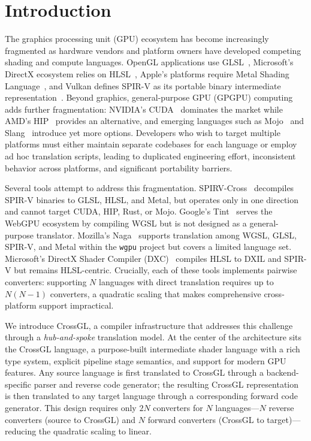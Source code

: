 \documentclass{svproc}
\begin{document}
\section{Introduction}

The graphics processing unit (GPU) ecosystem has become increasingly fragmented as hardware vendors and platform owners have developed competing shading and compute languages. OpenGL applications use GLSL~\cite{kessenich2016opengl}, Microsoft's DirectX ecosystem relies on HLSL~\cite{microsoft2023hlsl}, Apple's platforms require Metal Shading Language~\cite{apple2023metal}, and Vulkan defines SPIR-V as its portable binary intermediate representation~\cite{khronos2022spirv}. Beyond graphics, general-purpose GPU (GPGPU) computing adds further fragmentation: NVIDIA's CUDA~\cite{nickolls2008cuda} dominates the market while AMD's HIP~\cite{amd2023hip} provides an alternative, and emerging languages such as Mojo~\cite{modular2023mojo} and Slang~\cite{he2018slang} introduce yet more options. Developers who wish to target multiple platforms must either maintain separate codebases for each language or employ ad hoc translation scripts, leading to duplicated engineering effort, inconsistent behavior across platforms, and significant portability barriers.

Several tools attempt to address this fragmentation. SPIRV-Cross~\cite{khronos2023spirvcross} decompiles SPIR-V binaries to GLSL, HLSL, and Metal, but operates only in one direction and cannot target CUDA, HIP, Rust, or Mojo. Google's Tint~\cite{google2023tint} serves the WebGPU ecosystem by compiling WGSL but is not designed as a general-purpose translator. Mozilla's Naga~\cite{mozilla2023naga} supports translation among WGSL, GLSL, SPIR-V, and Metal within the \texttt{wgpu} project but covers a limited language set. Microsoft's DirectX Shader Compiler (DXC)~\cite{microsoft2023dxc} compiles HLSL to DXIL and SPIR-V but remains HLSL-centric. Crucially, each of these tools implements pairwise converters: supporting $N$ languages with direct translation requires up to $N(N-1)$ converters, a quadratic scaling that makes comprehensive cross-platform support impractical.

We introduce CrossGL, a compiler infrastructure that addresses this challenge through a \emph{hub-and-spoke} translation model. At the center of the architecture sits the CrossGL language, a purpose-built intermediate shader language with a rich type system, explicit pipeline stage semantics, and support for modern GPU features. Any source language is first translated to CrossGL through a backend-specific parser and reverse code generator; the resulting CrossGL representation is then translated to any target language through a corresponding forward code generator. This design requires only $2N$ converters for $N$ languages---$N$ reverse converters (source to CrossGL) and $N$ forward converters (CrossGL to target)---reducing the quadratic scaling to linear.
\end{document}
